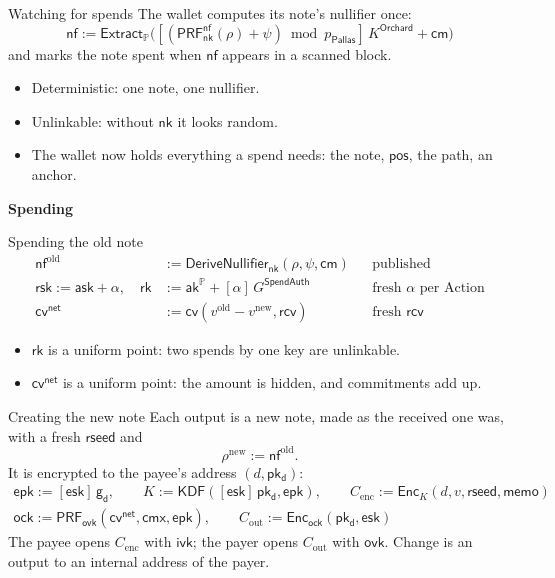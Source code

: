 \documentclass[aspectratio=169,11pt]{beamer}
\newcommand{\nfsym}{\ensuremath{\mathsf{nf}}}
\newcommand{\cmsym}{\ensuremath{\mathsf{cm}}}
\newcommand{\cmx}{\ensuremath{\mathsf{cmx}}}
\newcommand{\cvsym}{\ensuremath{\mathsf{cv}}}
\newcommand{\rksym}{\ensuremath{\mathsf{rk}}}
\newcommand{\gd}{\ensuremath{\mathsf{g_d}}}
\newcommand{\pkd}{\ensuremath{\mathsf{pk_d}}}
\newcommand{\aksym}{\ensuremath{\mathsf{ak}}}
\newcommand{\nksym}{\ensuremath{\mathsf{nk}}}
\newcommand{\asksym}{\ensuremath{\mathsf{ask}}}
\newcommand{\ivk}{\ensuremath{\mathsf{ivk}}}
\newcommand{\ovk}{\ensuremath{\mathsf{ovk}}}
\newcommand{\rcv}{\ensuremath{\mathsf{rcv}}}
\newcommand{\rsk}{\ensuremath{\mathsf{rsk}}}
\newcommand{\esk}{\ensuremath{\mathsf{esk}}}
\newcommand{\epk}{\ensuremath{\mathsf{epk}}}
\newcommand{\Extract}{\ensuremath{\mathsf{Extract}}}
\newcommand{\divider}[1]{\begin{frame}[plain]\vfill\centering
  {\usebeamercolor[fg]{structure}\Huge\bfseries #1}\vfill\end{frame}}
\newcommand{\PP}{\mathbb{P}}
\newcommand{\pP}{p_{\mathsf{Pallas}}}
\newcommand{\Ext}{\Extract_{\PP}}
\newcommand{\akP}{\aksym^{\PP}}
\newcommand{\rk}{\rksym}
\newcommand{\PRF}[1]{\mathsf{PRF}_{#1}}
\newcommand{\KDF}{\mathsf{KDF}}
\newcommand{\Enc}{\mathsf{Enc}}
\newcommand{\DNf}{\mathsf{DeriveNullifier}}
\newcommand{\KO}{K^{\mathsf{Orchard}}}
\newcommand{\GS}{G^{\mathsf{SpendAuth}}}
\newcommand{\cvnet}{\cvsym^{\mathsf{net}}}
\newcommand{\rseed}{\mathsf{rseed}}
\begin{document}
\begin{frame}{Watching for spends}
The wallet computes its note's nullifier once:
\[
\nfsym := \Ext\bigl([(\PRF{\nksym}^{\mathsf{nf}}(\rho) + \psi) \bmod \pP]\,\KO
  + \cmsym\bigr)
\]
and marks the note spent when $\nfsym$ appears in a scanned block.
\vfill
\begin{itemize}\itemsep5pt
\item Deterministic: one note, one nullifier.
\item Unlinkable: without $\nksym$ it looks random.
\item The wallet now holds everything a spend needs: the note, $\mathsf{pos}$,
  the path, an anchor.
\end{itemize}
\end{frame}

\divider{Spending}

\begin{frame}{Spending the old note}
\begin{align*}
\nfsym^{\mathrm{old}} &:= \DNf_{\nksym}(\rho, \psi, \cmsym) && \text{published} \\
\rsk := \asksym + \alpha, \quad \rk &:= \akP + [\alpha]\,\GS && \text{fresh } \alpha \text{ per Action} \\
\cvnet &:= \cvsym(v^{\mathrm{old}} - v^{\mathrm{new}}, \rcv) && \text{fresh } \rcv
\end{align*}
\vfill
\begin{itemize}\itemsep5pt
\item $\rk$ is a uniform point: two spends by one key are unlinkable.
\item $\cvnet$ is a uniform point: the amount is hidden, and commitments add up.
\end{itemize}
\end{frame}

\begin{frame}{Creating the new note}
Each output is a new note, made as the received one was, with a fresh
$\rseed$ and
\[
\rho^{\mathrm{new}} := \nfsym^{\mathrm{old}} .
\]
It is encrypted to the payee's address $(d, \pkd)$:
\begin{gather*}
\epk := [\esk]\,\gd, \qquad K := \KDF([\esk]\,\pkd, \epk), \qquad
C_{\mathrm{enc}} := \Enc_K(d, v, \rseed, \mathsf{memo}) \\
\mathsf{ock} := \PRF{\ovk}(\cvnet, \cmx, \epk), \qquad
C_{\mathrm{out}} := \Enc_{\mathsf{ock}}(\pkd, \esk)
\end{gather*}
\vfill
The payee opens $C_{\mathrm{enc}}$ with $\ivk$; the payer opens
$C_{\mathrm{out}}$ with $\ovk$. Change is an output to an internal address
of the payer.
\end{frame}
\end{document}
